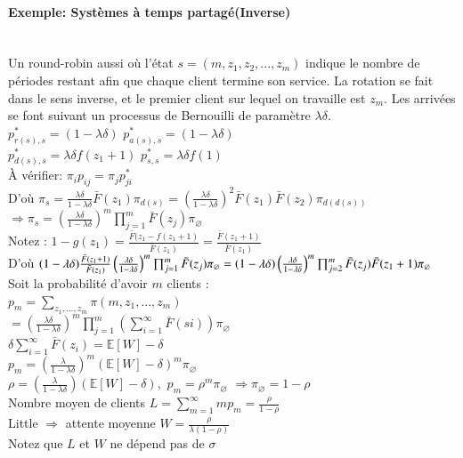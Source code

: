 \documentclass[paper=a4,fontsize=8pt,pagesize,DIV=calc]{scrartcl}
\newcounter{row}
\begin{document}
\begin{multicols}{3}
\paragraph{Exemple: Systèmes à temps partagé(Inverse)}~~\\
Un round-robin aussi où l’état $s = (m, z_1, z_2, . . . , z_m)$ indique le nombre de périodes restant afin que chaque client termine son service.
La rotation se fait dans le sens inverse, et le premier client sur lequel on travaille est $z_m$. Les arrivées se font suivant un processus de Bernouilli de paramètre $\lambda\delta$.
\\$p^*_{r(s),s} = (1-\lambda\delta)$ \qquad $p^*_{a(s),s} = (1 -\lambda\delta)$ 
\\ $p^*_{d(s),s} =\lambda\delta f(z_1 + 1)$ \qquad $p^*_{s,s} = \lambda\delta f(1)$
\\À vérifier: $\pi_ip_{ij}=\pi_j p^*_{ji}$
\\D'où $\pi_s = \frac{ \lambda\delta }{1- \lambda\delta }\bar{F}(z_1)\pi_{d(s)} =\left(\frac{ \lambda\delta }{1- \lambda\delta }\right)^2 \bar{F}(z_1)\bar{F}(z_2)\pi_{d(d(s))}$ $\Rightarrow \pi_s =\left(\frac{ \lambda\delta }{1- \lambda\delta }\right)^m \prod_{j=1}^m \bar{F}(z_j)\pi_{\varnothing}$
\\Notez : $1 - g(z_1) =\frac{\bar{F}(z_1-f(z_1+1)}{\bar{F}(z_1)} =\frac{\bar{F}(z_1+1)}{\bar{F}(z_1)}$
\\ D'où $(1 -\lambda\delta) \frac{\bar{F}(z_1+1)}{\bar{F}(z_1)} \left(\frac{\lambda\delta}{1-\lambda\delta}\right)^m \prod_{j=1}^m \bar{F}(z_j)\pi_\varnothing \\=(1 -\lambda\delta)  \left(\frac{\lambda\delta}{1-\lambda\delta}\right)^m \prod_{j=2}^m \bar{F}(z_j)\bar{F}(z_1+1)\pi_\varnothing $
\\Soit la probabilité d’avoir $m$ clients :
\\$p_m =\sum_{z_1,...,z_m}\pi(m,z_1,...,z_m) $\\$=\left(\frac{\lambda\delta}{1-\lambda\delta}\right)^m \prod_{j=1}^m\left(\sum_{i=1}^{\infty}\bar{F}(si)\right)\pi_\varnothing$
\\ $\delta \sum_{i=1}^\infty \bar{F}(z_i)=\mathbb{E}[W]-\delta$
\\ $p_m=\left(\frac{\lambda}{1-\lambda\delta}\right)^m(\mathbb{E}[W]-\delta)^m \pi_\varnothing$
\\$\rho=\left(\frac{\lambda}{1-\lambda\delta} \right)(\mathbb{E}[W]-\delta),$ $p_m=\rho^m\pi_\varnothing$ $\Rightarrow \pi_\varnothing=1-\rho$
\\Nombre moyen de clients $L =\sum_{m=1}^{\infty}mp_m=\frac{\rho}{1-\rho}$
\\Little $\Rightarrow$ attente moyenne $W =\frac{\rho}{\lambda(1-\rho)}$
\\ Notez que $L$ et $W$ ne dépend pas de $\sigma$

\end{multicols}
\end{document}
